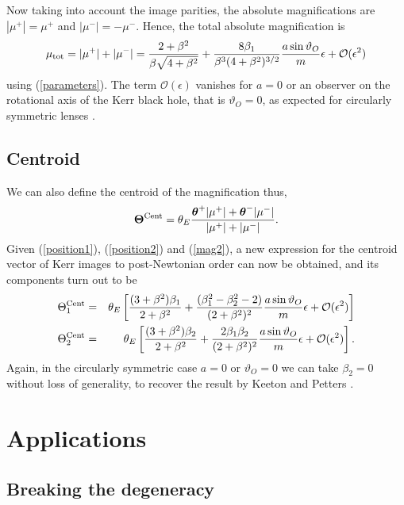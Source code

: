 \documentclass[prd,12pt,a4paper,showpacs]{revtex4}
\def\x{\theta}
\def\z{\beta}
\def\zo{\z_1}
\def\zt{\z_2}
\begin{document}
Now taking into account the image parities, the absolute magnifications 
are $|\mu^+|=\mu^+$ and $|\mu^-|=-\mu^-$.  Hence, the total absolute magnification
is 
\begin{equation}
\mu_{\rm tot} = 
|\mu^+|+|\mu^-|=\frac{2+\z^2}{\z\sqrt{4+\z^2}}+\frac{8\zo}{\z^3(4+\z^2)^{3/2}}\frac{a\sin\vartheta_O}{m}\epsilon+\mathcal{O}(\epsilon^2)
\label{mag4}
\end{equation}
using (\ref{parameters}). 
The term $\mathcal{O}(\epsilon)$ vanishes for $a=0$ or an observer on the 
rotational axis of the Kerr black hole, that is $\vartheta_O=0$, as expected for 
circularly symmetric lenses \cite{keeton1}.

\subsection{Centroid}

We can also define the centroid of the magnification thus,
\[
\mathbf{\Theta^{\rm Cent}}
=\theta_E\frac{\boldsymbol{\x}^+|\mu^+|+\boldsymbol{\x}^-|\mu^-|}{|\mu^+|+|\mu^-|}.
\]
Given (\ref{position1}), (\ref{position2}) and (\ref{mag2}), 
a new expression for the centroid vector of Kerr images to post-Newtonian order 
can now be obtained, and its components turn out to be
\begin{eqnarray}
\Theta^{\rm Cent}_1 &=&\theta_E\left[\frac{(3+\z^2)\zo}{2+\z^2}
+\frac{(\zo^2-\zt^2-2)}{(2+\z^2)^2}\frac{a\sin\vartheta_O}{m}\epsilon
+\mathcal{O}(\epsilon^2)\right] \nonumber \\
\Theta^{\rm Cent}_2 &=&\theta_E\left[\frac{(3+\z^2)\zt}{2+\z^2}
+\frac{2\zo\zt}{(2+\z^2)^2}\frac{a\sin\vartheta_O}{m}\epsilon
+\mathcal{O}(\epsilon^2)\right].
\label{centroid}
\end{eqnarray}
Again, in the circularly symmetric case $a=0$ or $\vartheta_O=0$ we can take $\zt=0$ without 
loss of generality, to recover the result by Keeton and Petters \cite{keeton1}.

\section{Applications}

\subsection{Breaking the degeneracy}
\end{document}
